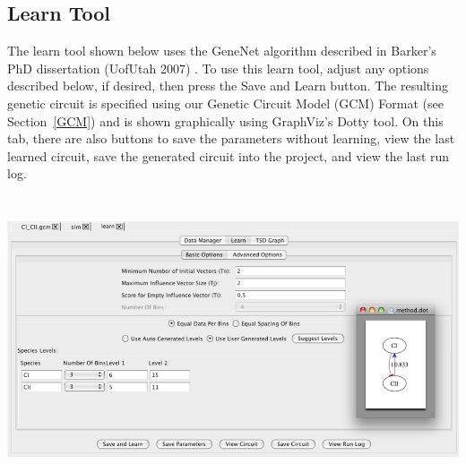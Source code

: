\documentclass[titlepage,11pt]{article}
\begin{document}
\clearpage

\subsection{\label{learnTool}Learn Tool}

\noindent
The learn tool shown below uses the GeneNet algorithm described in
Barker's PhD dissertation (UofUtah 2007)
. To use this learn tool, adjust
any options described below, if desired, then press the Save and
Learn button. The resulting genetic circuit is specified using
our Genetic Circuit Model (GCM) Format (see Section~\ref{GCM}) and is shown
graphically using GraphViz's Dotty tool. On this tab, there are also 
buttons to save the parameters without learning, view the last learned 
circuit, save the generated circuit into the project, and view the last run
log. 
\begin{center}
\includegraphics[height=85mm]{screenshots/learn}
\end{center}
\end{document}
